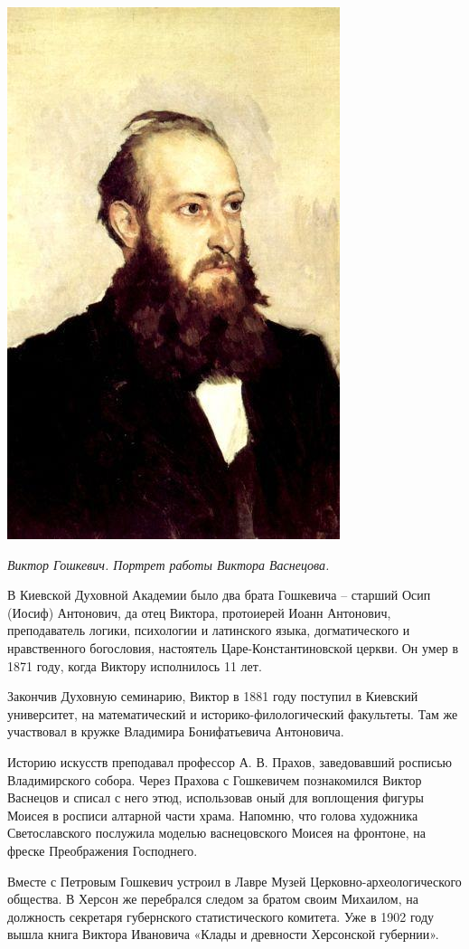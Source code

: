 \begin{center}
\includegraphics[width=0.55\linewidth]{chast-gorodki/star-ist/goshkevich01.jpg}

\textit{Виктор Гошкевич. Портрет работы Виктора Васнецова.}
\end{center}

В Киевской Духовной Академии было два брата Гошкевича – старший Осип (Иосиф) Антонович, да отец Виктора, протоиерей Иоанн Антонович, преподаватель логики, психологии и латинского языка, догматического и нравственного богословия, настоятель Царе-Константин\-овской церкви. Он умер в 1871 году, когда Виктору исполнилось 11 лет.

Закончив Духовную семинарию, Виктор в 1881 году поступил в Киевский университет, на  математический и историко-филологический факультеты. Там же участвовал в кружке Владимира Бонифатьевича Антоновича.

Историю искусств преподавал профессор А. В. Прахов, заведовавший росписью Владимирского собора. Через Прахова с Гошкевичем познакомился Виктор Васнецов и списал с него этюд, использовав оный для воплощения фигуры Моисея в росписи алтарной части храма. Напомню, что голова художника Светославского послужила моделью васнецовского Моисея на фронтоне, на фреске Преображения Господнего.

Вместе с Петровым Гошкевич устроил в Лавре Музей Цер\-ковно-археологического общества. В Херсон же перебрался следом за братом своим Михаилом, на должность секретаря губернского статистического комитета. Уже в 1902 году вышла книга Виктора Ивановича «Клады и древности Херсонской губернии».

